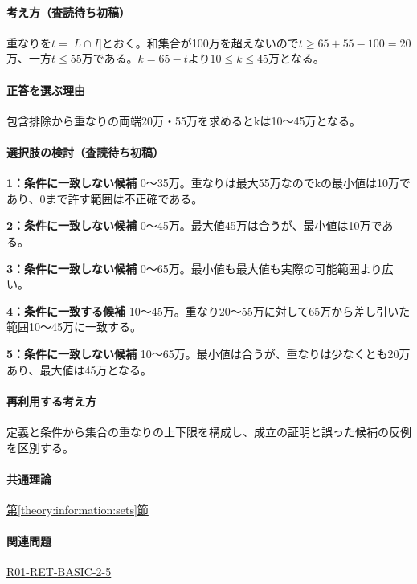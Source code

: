 \paragraph{考え方（査読待ち初稿）} 重なりを\(t=|L\cap I|\)とおく。和集合が100万を超えないので\(t\ge65+55-100=20\)万、一方\(t\le55\)万である。\(k=65-t\)より\(10\le k\le45\)万となる。

\paragraph{正答を選ぶ理由} 包含排除から重なりの両端20万・55万を求めるとkは10〜45万となる。

\paragraph{選択肢の検討（査読待ち初稿）}\mbox{}\par

\noindent\textbf{1：条件に一致しない候補} 0〜35万。重なりは最大55万なのでkの最小値は10万であり、0まで許す範囲は不正確である。\par

\noindent\textbf{2：条件に一致しない候補} 0〜45万。最大値45万は合うが、最小値は10万である。\par

\noindent\textbf{3：条件に一致しない候補} 0〜65万。最小値も最大値も実際の可能範囲より広い。\par

\noindent\textbf{4：条件に一致する候補} 10〜45万。重なり20〜55万に対して65万から差し引いた範囲10〜45万に一致する。\par

\noindent\textbf{5：条件に一致しない候補} 10〜65万。最小値は合うが、重なりは少なくとも20万あり、最大値は45万となる。\par

\paragraph{再利用する考え方} 定義と条件から集合の重なりの上下限を構成し、成立の証明と誤った候補の反例を区別する。

\paragraph{共通理論} \hyperref[theory:information:sets]{第\ref*{theory:information:sets}節}

\paragraph{関連問題} \hyperref[q:r01-ret-basic-2-5]{R01-RET-BASIC-2-5}

